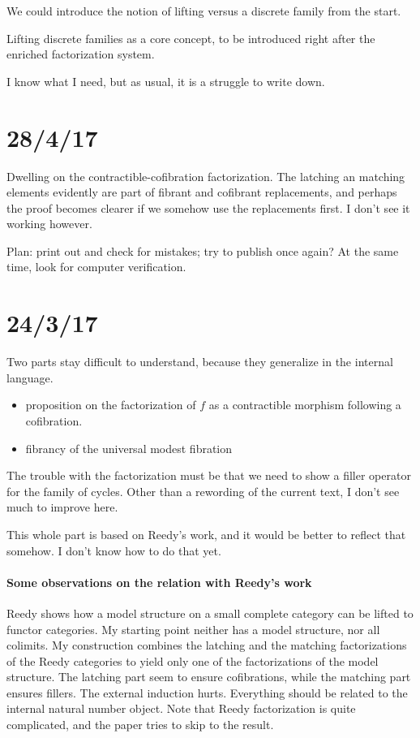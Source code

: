 \documentclass{tac}
\begin{document}
We could introduce the notion of lifting versus a discrete family from the start. 

Lifting discrete families as a core concept, to be introduced right after the enriched factorization system.

I know what I need, but as usual, it is a struggle to write down.

\section{28/4/17}
Dwelling on the contractible-cofibration factorization. The latching an matching elements evidently are part of fibrant and cofibrant replacements, and perhaps the proof becomes clearer if we somehow use the replacements first. I don't see it working however.

Plan: print out and check for mistakes; try to publish once again? At the same time, look for computer verification.


\section{24/3/17}
Two parts stay difficult to understand, because they generalize in the internal language.
\begin{itemize}
\item proposition on the factorization of $f$ as a contractible morphism following a cofibration.
\item fibrancy of the universal modest fibration
\end{itemize}

The trouble with the factorization must be that we need to show a filler operator for the family of cycles. Other than a rewording of the current text, I don't see much to improve here.

This whole part is based on Reedy's work, and it would be better to reflect that somehow.
I don't know how to do that yet.

\paragraph{Some observations on the relation with Reedy's work}
Reedy shows how a model structure on a small complete category can be lifted to functor categories. My starting point neither has a model structure, nor all colimits.
My construction combines the latching and the matching factorizations of the Reedy categories to yield only one of the factorizations of the model structure.
The latching part seem to ensure cofibrations, while the matching part ensures fillers.
The external induction hurts. Everything should be related to the internal natural number object.
Note that Reedy factorization is quite complicated, and the paper tries to skip to the result.
\end{document}
